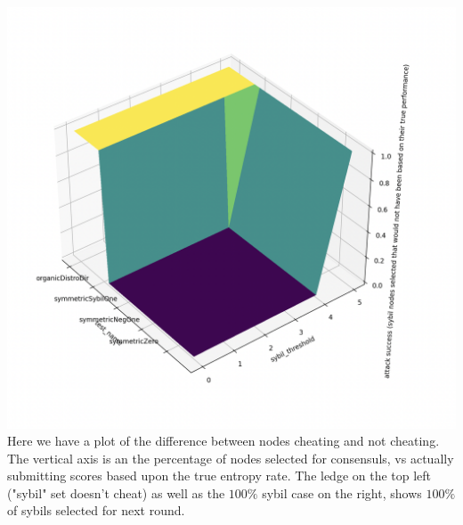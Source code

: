 \documentclass{article}
\begin{document}
\includegraphics[width=\textwidth, height=\textwidth]{attack-success-suface-plot}
Here we have a plot of the difference between nodes cheating and not cheating. The vertical axis is an the percentage of nodes selected for consensuls, vs actually submitting scores based upon the true entropy rate. The ledge on the top left ("sybil" set doesn't cheat) as well as the $100\%$ sybil case on the right, shows $100\%$ of sybils selected for next round. 
\end{document}
